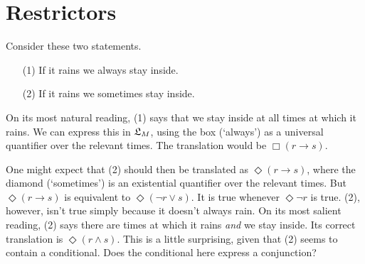 
\fi


\section{Restrictors}
\label{sec:restrictor-analysis}

Consider these two statements.
\begin{enumerate}[leftmargin=10mm]
  \itemsep-1mm
  \item[(1)] If it rains we always stay inside.
  \item[(2)] If it rains we sometimes stay inside.
\end{enumerate}
On its most natural reading, (1) says that we stay inside at all times at which
it rains. We can express this in $\mathfrak{L}_{M}$, using the box (`always') as a
universal quantifier over the relevant times. The translation would be
$\Box(r \to s)$.

One might expect that (2) should then be translated as $\Diamond(r \to s)$,
where the diamond (`sometimes') is an existential quantifier over the relevant
times. But $\Diamond(r \to s)$ is equivalent to $\Diamond(\neg r \lor s)$. It is
true whenever $\Diamond \neg r$ is true. (2), however, isn't true simply because
it doesn't always rain. On its most salient reading, (2) says there are times at
which it rains \emph{and} we stay inside. Its correct translation is
$\Diamond(r \land s)$. This is a little surprising, given that (2) seems to
contain a conditional. Does the conditional here express a conjunction?

